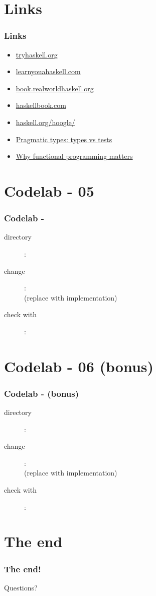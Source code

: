 \documentclass[17pt]{beamer}
\renewcommand{\(}[1]{\begin{columns}[#1]}
\renewcommand{\)}{\end{columns}}
\newcommand{\<}[1]{\begin{column}{#1}}
\renewcommand{\>}{\end{column}}
\begin{document}
\section{Links}

\begin{frame}
  \frametitle{Links}
  \begin{itemize}
  \item \href{https://tryhaskell.org}{tryhaskell.org}
  \item \href{https://learnyouahaskell.com}{learnyouahaskell.com}
  \item \href{https://book.realworldhaskell.org}{book.realworldhaskell.org}
  \item \href{http://haskellbook.com}{haskellbook.com}
  \item \href{https://www.haskell.org/hoogle/}{haskell.org/hoogle/}
  \item \href{https://dev.to/stereobooster/pragmatic-types-type-systems-vs-tests-4k3e}{Pragmatic types: types vs tests}
  \item \href{https://www.cs.kent.ac.uk/people/staff/dat/miranda/whyfp90.pdf}{Why functional programming matters}
  \end{itemize}
\end{frame}


\section{Codelab - 05}

\begin{frame}
  \frametitle{Codelab - }
  \begin{description}
    \item[directory]: 
    \item[change]:  \\
      (replace  with implementation)
    \item[check with]: 
  \end{description}
\end{frame}


\section{Codelab - 06 (bonus)}

\begin{frame}
  \frametitle{Codelab -  (bonus)}
  \begin{description}
    \item[directory]: 
    \item[change]:  \\
      (replace  with implementation)
    \item[check with]: 
  \end{description}
\end{frame}


\section{The end}

\begin{frame}
  \frametitle{The end!}
  \begin{center}
    Questions?
  \end{center}
\end{frame}

\end{document}
